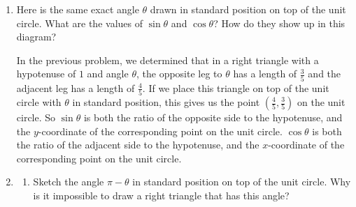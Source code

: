\documentclass[main]{subfiles}
\begin{document}
\begin{enumerate}[resume]
\begin{enumerate}
\item 
\begin{problem}
    Here is the same exact angle $\theta$ drawn in standard position on top of the unit circle. What are the values of $\sin\theta$ and $\cos\theta$? How do they show up in this diagram?

\end{problem}

\begin{solution}
    In the previous problem, we determined that in a right triangle with a hypotenuse of $1$ and angle $\theta$, the opposite leg to $\theta$ has a length of $\frac{3}{5}$ and the adjacent leg has a length of $\frac{4}{5}$. If we place this triangle on top of the unit circle with $\theta$ in standard position, this gives us the point $(\frac{4}{5}, \frac{3}{5})$ on the unit circle. So $\sin\theta$ is both the ratio of the opposite side to the hypotenuse, and the $y$-coordinate of the corresponding point on the unit circle. $\cos\theta$ is both the ratio of the adjacent side to the hypotenuse, and the $x$-coordinate of the corresponding point on the unit circle.
\end{solution}

\item
\begin{enumerate}
\item 
\begin{problem}
Sketch the angle $\pi-\theta$ in standard position on top of the unit circle. Why is it impossible to draw a right triangle that has this angle?
\end{problem}


\end{enumerate}
\end{enumerate}
\end{enumerate}
\end{document}
